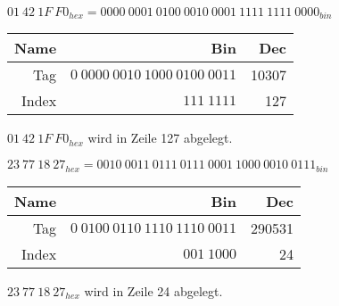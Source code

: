 \documentclass[10pt]{article}
\begin{document}
\begin{enumerate}[label=\alph*)]
		$01\:42\:1F\:F0_{hex} = 0000\:0001\:0100\:0010\:0001\:1111\:1111\:0000_{bin}$
		
		\begin{tabular}{r | r | r}
			Name & Bin & Dec\\
			\hline
			Tag & $0\:0000\:0010\:1000\:0100\:0011$ & 10307\\
			Index & $111\:1111$ & 127\\
		\end{tabular}

		$01\:42\:1F\:F0_{hex}$ wird in Zeile 127 abgelegt.
		
		$23\:77\:18\:27_{hex} = 0010\:0011\:0111\:0111\:0001\:1000\:0010\:0111_{bin}$
		
		\begin{tabular}{r | r | r}
			Name & Bin & Dec\\
			\hline
			Tag & $0\:0100\:0110\:1110\:1110\:0011$ & 290531\\
			Index & $001\:1000$ & 24\\
		\end{tabular}
		
		$23\:77\:18\:27_{hex}$ wird in Zeile 24 abgelegt.
		
\end{enumerate}
\end{document}
